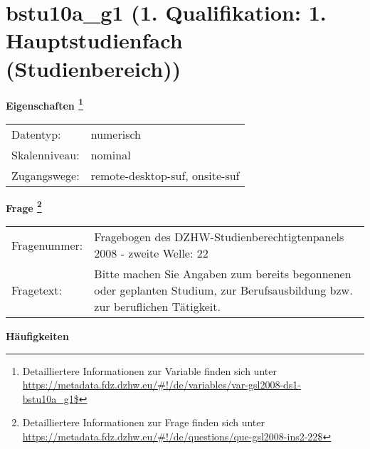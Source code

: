 
    \setcounter{footnote}{0}

    \vspace*{-1.8cm}
	\section{bstu10a\_g1 (1. Qualifikation: 1. Hauptstudienfach (Studienbereich))}
	\label{section:bstu10a_g1}



    \vspace*{0.5cm}
    \noindent\textbf{Eigenschaften
	\footnote{Detailliertere Informationen zur Variable finden sich unter
		\url{https://metadata.fdz.dzhw.eu/\#!/de/variables/var-gsl2008-ds1-bstu10a_g1$}}}\\
	\begin{tabularx}{\hsize}{@{}lX}
	Datentyp: & numerisch \\
	Skalenniveau: & nominal \\
	Zugangswege: &
	  remote-desktop-suf, 
	  onsite-suf
 \\
    \end{tabularx}



				\vspace*{0.5cm}
                \noindent\textbf{Frage
	                \footnote{Detailliertere Informationen zur Frage finden sich unter
		              \url{https://metadata.fdz.dzhw.eu/\#!/de/questions/que-gsl2008-ins2-22$}}}\\
				\begin{tabularx}{\hsize}{@{}lX}
					Fragenummer: &
					  Fragebogen des DZHW-Studienberechtigtenpanels 2008 - zweite Welle:
					  22
 \\
					Fragetext: & Bitte machen Sie Angaben zum bereits begonnenen oder geplanten Studium, zur Berufsausbildung bzw. zur beruflichen Tätigkeit. \\
				\end{tabularx}





        		\vspace*{0.5cm}
                \noindent\textbf{Häufigkeiten}

